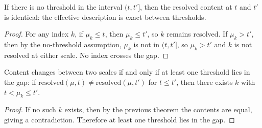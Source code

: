 \begin{theorem}
If there is no threshold in the interval $(t, t']$, then the resolved content at $t$ and $t'$ is identical: the effective description is exact between thresholds.
\end{theorem}

\begin{proof}
For any index $k$, if $\mu_k \leq t$, then $\mu_k \leq t'$, so $k$ remains resolved. If $\mu_k > t'$, then by the no-threshold assumption, $\mu_k$ is not in $(t, t']$, so $\mu_k > t'$ and $k$ is not resolved at either scale. No index crosses the gap.
\end{proof}

\begin{theorem}
Content changes between two scales if and only if at least one threshold lies in the gap: if $\mathrm{resolved}(\mu, t) \neq \mathrm{resolved}(\mu, t')$ for $t \leq t'$, then there exists $k$ with $t < \mu_k \leq t'$.
\end{theorem}

\begin{proof}
If no such $k$ exists, then by the previous theorem the contents are equal, giving a contradiction. Therefore at least one threshold lies in the gap.
\end{proof}

